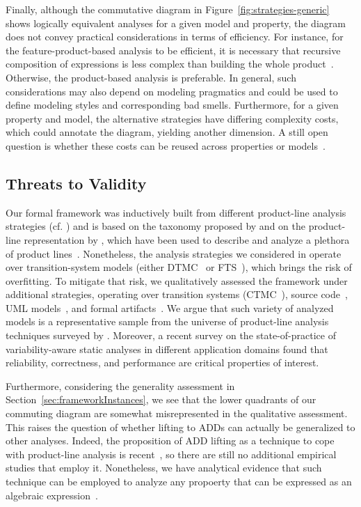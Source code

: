 Finally, although the commutative diagram in Figure~\ref{fig:strategies-generic} shows logically equivalent analyses for a given model and property, the diagram
does not convey practical considerations in terms of efficiency. For instance,  
for the feature-product-based analysis to be efficient, it is necessary that recursive composition of expressions is less complex than building the whole product~\cite{Ghezzi2013}. Otherwise, the product-based analysis is preferable. 
In general, such considerations may also depend on modeling pragmatics and could be used to define modeling styles and 
corresponding bad smells.
Furthermore, for a given property and model, the alternative strategies have differing complexity costs, which could 
annotate the diagram, yielding another dimension. A still open question is whether these costs can be reused across 
properties or models~\cite{LANNA2017,StaticAnalysisInPractice,TypeCheckingComparison,SamplingStrategies}.



\subsection{Threats to Validity}
   \label{sec:threatsToValidity}
Our formal framework was inductively built from different product-line analysis
strategies (cf. ) and is based on the taxonomy proposed by
\citet{Thum2014} and on the product-line representation by \citet{Kastner2008}, which have been used to describe and analyze a plethora of product lines~\cite{Thum2014}.
Nonetheless, the analysis strategies we considered in   operate over transition-system models (either
DTMC~\cite{LANNA2017,Castro2017} or FTS~\cite{Classen2013,Classen2014}), which brings
the risk of overfitting.
To mitigate that risk, we qualitatively assessed the framework under additional
strategies, operating over transition systems (CTMC~\cite{kowal_scaling_2015}), source
code~\cite{ApelSimulator,SPLLift}, UML models~\cite{securityGPCE18}, and formal
artifacts~\cite{DOPTheo}.
We argue that such variety of analyzed models is a representative sample from the
universe of product-line analysis techniques surveyed by \citet{Thum2014}.
Moreover, a recent survey on the state-of-practice of
variability-aware static analyses in different application domains
\cite{IndustrialAnalysisSurvey} found that reliability,
correctness, and performance are critical properties of interest.

Furthermore, considering the generality assessment  in Section~\ref{sec:frameworkInstances}, we see that the
lower quadrants of our commuting diagram are somewhat misrepresented in the
qualitative assessment.
This raises the question of whether lifting to ADDs can actually be generalized to
other analyses.
Indeed, the proposition of ADD lifting as a technique to cope with product-line
analysis is recent~\cite{LANNA2017}, so there are still no additional empirical
studies that employ it.
Nonetheless, we have analytical evidence that such technique can be employed to
analyze any propoerty that can be expressed as an algebraic
expression~\cite{Castro2017}.

